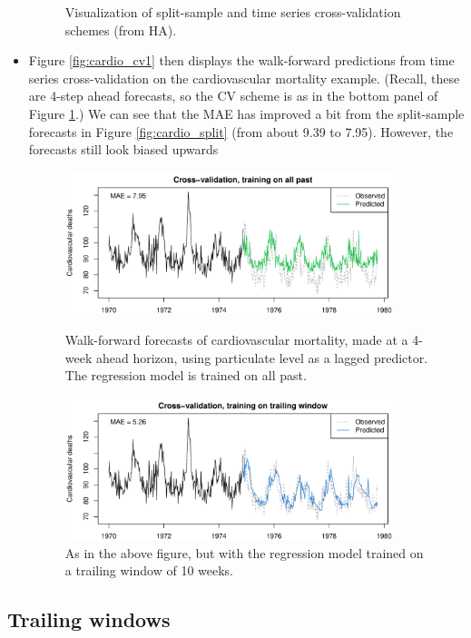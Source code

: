 \documentclass{article}
\begin{document}
\begin{itemize}
\begin{figure}[p]
\medskip
\caption{Visualization of split-sample and time series cross-validation schemes
  (from HA).} 
\label{fig:split_cv}
\end{figure}

\item Figure \ref{fig:cardio_cv1} then displays the walk-forward predictions
  from time series cross-validation on the cardiovascular mortality
  example. (Recall, these are 4-step ahead forecasts, so the CV scheme is as in
  the bottom panel of Figure \ref{fig:split_cv}.) We can see that the MAE has
  improved a bit from the split-sample forecasts in Figure
  \ref{fig:cardio_split} (from about 9.39 to 7.95). However, the forecasts still
  look biased upwards  

\begin{figure}[htb]
\centering
\includegraphics[width=0.9\textwidth]{fig/cardio-cv-1.pdf} 
\caption{Walk-forward forecasts of cardiovascular mortality, made at a 4-week
  ahead horizon, using particulate level as a lagged predictor. The regression
  model is trained on all past.} 
\label{fig:cardio_cv1}

\bigskip
\includegraphics[width=0.9\textwidth]{fig/cardio-cv-2.pdf} 
\caption{As in the above figure, but with the regression model trained on a
  trailing window of 10 weeks.} 
\label{fig:cardio_cv2}
\end{figure}
\end{itemize}

\subsection{Trailing windows}
\end{document}
